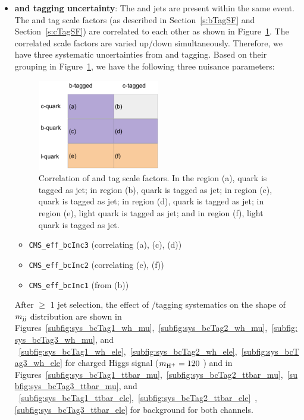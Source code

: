 \begin{itemize}[leftmargin=*]
\item {\bf {\PQb and \PQc tagging uncertainty}}: The \PQb and \PQc jets are present within the same 
    event. The \PQb and \PQc tag scale factors (as described in Section~\ref{s:bTagSF} and 
	Section~\ref{s:cTagSF}) are correlated to each other as shown in Figure~\ref{fig:bcCorr}. 
    	The correlated scale factors are varied up/down simultaneously. Therefore, we have three
	systematic uncertainties from \PQb and \PQc tagging. Based on their grouping in 
	Figure~\ref{fig:bcCorr}, we have the following three nuisance parameters:
    \begin{figure}
    \begin{center}
    \includegraphics[width=0.50\textwidth]{Image/bcCorrelation.pdf}
    \caption{Correlation of \PQb and \PQc tag scale factors. In the region (a), \PQc quark is tagged 
	as \PQb jet; in region (b), \PQc quark is tagged as \PQc jet; in region (c), \PQb quark is 
	tagged as \PQb jet; in region (d), \PQb quark is tagged as \PQc jet; in region (e), light 
	quark is tagged as \PQb jet; and in region (f), light quark is tagged as \PQc jet.}
    \label{fig:bcCorr}
    \end{center}
    \end{figure}
    \begin{itemize}[leftmargin=*]
    \item \verb|CMS_eff_bcInc3| (correlating (a), (c), (d))
    \item \verb|CMS_eff_bcInc2| (correlating (e), (f))
    \item \verb|CMS_eff_bcInc1| (from (b))
    \end{itemize}
    After $\geq$ 1 \PQc jet selection, the effect of \PQb/\PQc tagging systematics on the shape 
	of $m_\text{jj}$ distribution are shown in    
    Figures~\ref{subfig:sys_bcTag1_wh_mu},~\ref{subfig:sys_bcTag2_wh_mu},~\ref{subfig:sys_bcTag3_wh_mu},
    and ~\ref{subfig:sys_bcTag1_wh_ele},~\ref{subfig:sys_bcTag2_wh_ele},~\ref{subfig:sys_bcTag3_wh_ele}
    for charged Higgs signal ($m_{\text{H}^+} = 120$ \GeV) and in
    Figures~\ref{subfig:sys_bcTag1_ttbar_mu},~\ref{subfig:sys_bcTag2_ttbar_mu},~\ref{subfig:sys_bcTag3_ttbar_mu},
    and
    ~\ref{subfig:sys_bcTag1_ttbar_ele},~\ref{subfig:sys_bcTag2_ttbar_ele}~,\ref{subfig:sys_bcTag3_ttbar_ele}
    for \ttjets background for both channels.


\end{itemize}
